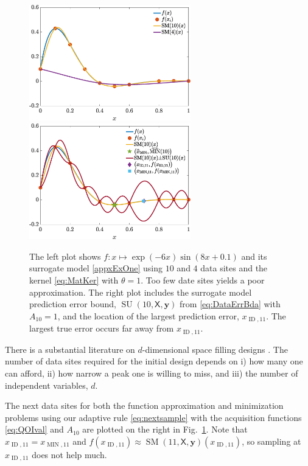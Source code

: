 \documentclass[11pt]{NSFamsart}
\DeclareMathOperator{\SURR}{SM} %
\DeclareMathOperator{\MIN}{MIN}
\DeclareMathOperator{\ID}{ID}
\DeclareMathOperator{\SURRERR}{SU}
\newcommand{\mX}{\mathsf{X}}
\newcommand{\by}{{\boldsymbol{y}}}
\begin{document}
\begin{figure}[ht]
    \centering
    \includegraphics[width = 7cm]{ProgramsImages/fandDataAndAppxSmall.eps} \qquad \qquad
    \includegraphics[width = 7cm]{ProgramsImages/fandDataAndAppxAndRMSPEAndMin.eps}
    \caption{The left plot shows $f: x \mapsto \exp(-6x) \sin(8x+0.1)$ and its surrogate model \eqref{appxExOne} using $10$ and $4$ data sites and the kernel \eqref{eq:MatKer} with $\theta = 1$. Too few date sites yields a poor approximation.  The right plot includes the surrogate model prediction error bound, $\SURRERR(10,\mX,\by)$ from \eqref{eq:DataErrBda} with $A_{10} =1$, and the location of the largest prediction error, $x_{\ID,11}$. The largest true error occurs far away from $x_{\ID,11}$.}
    \label{fig:sampleFun}
\end{figure}

There is a substantial literature on $d$-dimensional space filling designs \cite{FangEtal19a, Jos16a, SanWilNot03}. The number of data sites required for the initial design depends on i) how many one can afford, ii) how narrow a peak one is willing to miss, and iii) the number of independent variables, $d$.

The next data sites for both the function approximation and minimization problems using our adaptive rule \eqref{eq:nextsample} with the acquisition functions \eqref{eq:QOIval} and $A_{10}$ are plotted on the right in Fig.\ \ref{fig:sampleFun}.  Note that $x_{\ID, 11} = x_{\MIN, 11}$ and $f(x_{\ID, 11}) \approx \SURR(11,\mX,\by)(x_{\ID, 11})$, so  sampling at $x_{\ID, 11}$ does not help much.  
\end{document}
